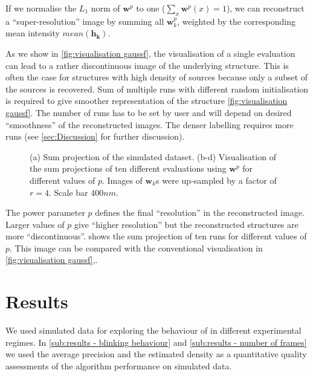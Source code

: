 If we normalise the $L_1$ norm of $\bm{w}^p$ to one ($\sum_x \bm{w}^p(x)=1$), we can reconstruct a ``super-resolution'' image by summing all $\bm{w}_k^p$, weighted by the corresponding mean intensity $\unit{mean}(\bm{h_k})$. 

As we show in \autoref{fig:visualisation gaussf}\ccc, the visualisation of a single \inmf{} evaluation can lead to a rather discontinuous image of the underlying structure. This is often the case for structures with high density of sources because only a subset of the sources is recovered. Sum of multiple \inmf{} runs with different random initialisation is required to give smoother representation of the structure \autoref{fig:visualisation gaussf}\ddd. The number of \inmf{} runs has to be set by user and will depend on desired ``smoothness'' of the reconstructed images. The denser labelling requires more \inmf{} runs (see \autoref{sec:Discussion} for further discussion). 

\begin{figure}[!bt]
	\newcommand{\sizef}{.48}			
	\newcommand{\widthfig}{1\textwidth}	
	\centering
	\caption{(a) Sum projection of the simulated dataset. (b-d) Visualisation of the sum projections of ten different \inmf{} evaluations using $\bm{w}^p$ for different values of $p$. Images of $\bm{w}_k$s were up-sampled by a factor of $r=4$. Scale bar $400 \unit{nm}$.}
	\label{fig:demo pow w result}	
\end{figure}

The power parameter $p$ defines the final ``resolution'' in the reconstructed image. Larger values of $p$ give ``higher resolution'' but the reconstructed structures are more ``discontinuous''.  shows the sum projection of ten \inmf{} runs for different values of $p$. This image can be compared with the conventional visualisation in \autoref{fig:visualisation gaussf}\ccc,\ddd. 

\clearpage
\section{Results \label{sec:results}}
We used simulated data for exploring the behaviour of \inmf{} in different experimental regimes. In \autoref{sub:results - blinking behaviour} and \ref{sub:results - number of frames} we used the average precision and the estimated density as a quantitative quality assessments of the algorithm performance on simulated data. 

